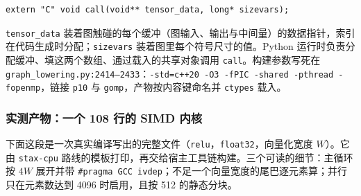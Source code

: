 \begin{lstlisting}[caption={C++ 包装器暴露的唯一入口（\texttt{codegen/cpp\_wrapper.py:3--12}）。}, label=lst:be:entry, style=cppstyle]
extern "C" void call(void** tensor_data, long* sizevars);
\end{lstlisting}

\texttt{tensor\_data} 装着图触碰的每个缓冲（图输入、输出与中间量）的数据指针，索引在代码生成时分配；\texttt{sizevars} 装着图里每个符号尺寸的值。Python 运行时负责分配缓冲、填这两个数组、通过载入的共享对象调用 \texttt{call}。构建参数写死在 \texttt{graph\_lowering.py:2414--2433}：\texttt{-std=c++20 -O3 -fPIC -shared -pthread -fopenmp}，链接 \texttt{p10} 与 \texttt{gomp}，产物按内容键命名并 \texttt{ctypes} 载入。

\subsubsection{实测产物：一个 108 行的 SIMD 内核}

下面这段是一次真实编译写出的完整文件（\texttt{relu}，\texttt{float32}，向量化宽度 $W$）。它由 \texttt{stax-cpu} 路线的模板打印，再交给宿主工具链构建。三个可读的细节：主循环按 $4W$ 展开并带 \texttt{\#pragma GCC ivdep}；不足一个向量宽度的尾巴逐元素算；并行只在元素数达到 4096 时启用，且按 512 的静态分块。

